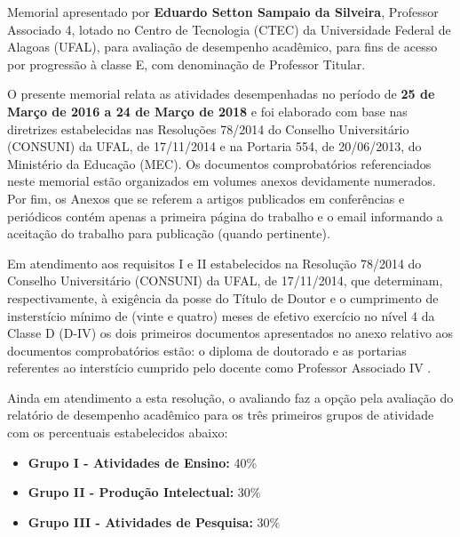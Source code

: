 \documentclass[a4paper,oneside,10pt]{article}
\newcounter{document}%
\begin{document}
\begin{onehalfspace}

Memorial apresentado por \textbf{Eduardo Setton Sampaio da Silveira}, Professor Associado 4, lotado no Centro de Tecnologia (CTEC) da Universidade Federal de Alagoas (UFAL), para avaliação de desempenho acad\^{e}mico, para fins de acesso por progressão à classe E, com denominação de Professor Titular.

O presente memorial relata as atividades desempenhadas no período de \textbf{25 de Março de 2016 a 24 de Março de 2018} e foi elaborado com base nas diretrizes estabelecidas nas Resoluções 78/2014 do Conselho Universitário (CONSUNI) da UFAL, de 17/11/2014  e na Portaria 554, de 20/06/2013, do Ministério da Educação (MEC). Os documentos comprobatórios referenciados neste memorial estão organizados em volumes anexos devidamente numerados. Por fim, os Anexos que se referem a artigos publicados em confer\^{e}ncias e periódicos contém apenas a primeira página do trabalho e o email informando a aceitação do trabalho para publicação (quando pertinente).

Em atendimento aos requisitos I e II estabelecidos na Resolução 78/2014 do Conselho Universitário (CONSUNI) da UFAL, de 17/11/2014, que determinam, respectivamente, à exigência da posse do Título de Doutor e o cumprimento de insterstício mínimo de (vinte e quatro) meses de efetivo exercício no nível 4 da Classe D (D-IV) os dois primeiros documentos apresentados no anexo relativo aos documentos comprobatórios estão: o diploma de doutorado \mbox{} e as portarias referentes ao interstício cumprido pelo docente como Professor Associado IV \mbox{}.

Ainda em atendimento a esta resolução, o avaliando faz a opção pela avaliação do relatório de desempenho acadêmico para os três primeiros grupos de atividade com os percentuais estabelecidos abaixo:\\
\begin{itemize}
\item \textbf{Grupo I - Atividades de Ensino:} 40\%
\item \textbf{Grupo II - Produção Intelectual:} 30\%
\item \textbf{Grupo III - Atividades de Pesquisa:} 30\%
\end{itemize}

\end{onehalfspace}
\end{document}
